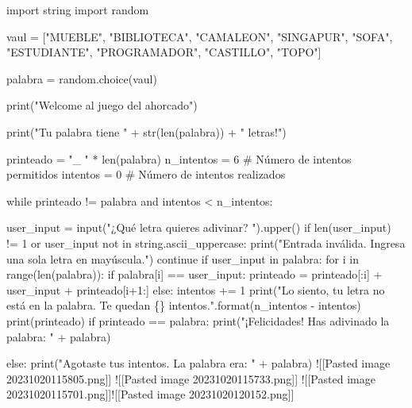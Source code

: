 \documentclass[
]{article}
\newenvironment{Shaded}{}{}
\newcommand{\NormalTok}[1]{#1}
\begin{document}
\begin{Shaded}
\begin{Highlighting}[]
\NormalTok{import string}
\NormalTok{import random}

\NormalTok{vaul = ["MUEBLE", "BIBLIOTECA", "CAMALEON", "SINGAPUR", "SOFA", "ESTUDIANTE", "PROGRAMADOR", "CASTILLO", "TOPO"]}

\NormalTok{palabra = random.choice(vaul)}

\NormalTok{print("Welcome al juego del ahorcado")}

\NormalTok{print("Tu palabra tiene " + str(len(palabra)) + " letras!")}
  
\NormalTok{printeado = "\_ " * len(palabra)}
\NormalTok{n\_intentos = 6  \# Número de intentos permitidos}
\NormalTok{intentos = 0  \# Número de intentos realizados}

\NormalTok{while printeado != palabra and intentos \textless{} n\_intentos:}

\NormalTok{    user\_input = input("¿Qué letra quieres adivinar? ").upper()}
\NormalTok{    if len(user\_input) != 1 or user\_input not in string.ascii\_uppercase:}
\NormalTok{        print("Entrada inválida. Ingresa una sola letra en mayúscula.")}
\NormalTok{        continue}
\NormalTok{    if user\_input in palabra:}
\NormalTok{        for i in range(len(palabra)):}
\NormalTok{            if palabra[i] == user\_input:}
\NormalTok{                printeado = printeado[:i] + user\_input + printeado[i+1:]}
\NormalTok{    else:}
\NormalTok{        intentos += 1}
\NormalTok{        print("Lo siento, tu letra no está en la palabra. Te quedan \{\} intentos.".format(n\_intentos {-} intentos)}
\NormalTok{    print(printeado)}
\NormalTok{if printeado == palabra:}
\NormalTok{    print("¡Felicidades! Has adivinado la palabra: " + palabra)}

\NormalTok{else:}
\NormalTok{    print("Agotaste tus intentos. La palabra era: " + palabra)\textasciigrave{}\textasciigrave{}\textasciigrave{}}
\NormalTok{![[Pasted image 20231020115805.png]]}
\NormalTok{![[Pasted image 20231020115733.png]]}
\NormalTok{![[Pasted image 20231020115701.png]]![[Pasted image 20231020120152.png]]}






















\end{Highlighting}
\end{Shaded}
\end{document}
